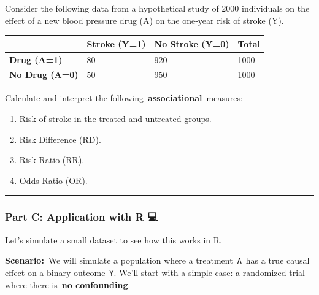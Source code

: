 \documentclass[
  10pt,
  letterpaper,
  DIV=11,
  numbers=noendperiod]{scrartcl}
\providecommand{\tightlist}{%
  \setlength{\itemsep}{0pt}\setlength{\parskip}{0pt}}
\begin{document}
Consider the following data from a hypothetical study of 2000
individuals on the effect of a new blood pressure drug (A) on the
one-year risk of stroke (Y).

\begin{longtable}[]{@{}llll@{}}
\toprule\noalign{}
& Stroke (Y=1) & No Stroke (Y=0) & Total \\
\midrule\noalign{}
\endhead
\bottomrule\noalign{}
\endlastfoot
\textbf{Drug (A=1)} & 80 & 920 & 1000 \\
\textbf{No Drug (A=0)} & 50 & 950 & 1000 \\
\end{longtable}

Calculate and interpret the following~\textbf{associational}~measures:

\begin{enumerate}
\def\labelenumi{\arabic{enumi}.}
\tightlist
\item
  Risk of stroke in the treated and untreated groups.
\item
  Risk Difference (RD).
\item
  Risk Ratio (RR).
\item
  Odds Ratio (OR).
\end{enumerate}

\begin{center}\rule{0.5\linewidth}{0.5pt}\end{center}

\subsubsection{Part C: Application with R
💻}\label{part-c-application-with-r-1}

Let's simulate a small dataset to see how this works in R.

\textbf{Scenario:}~We will simulate a population where a
treatment~\texttt{A}~has a true causal effect on a binary
outcome~\texttt{Y}. We'll start with a simple case: a randomized trial
where there is~\textbf{no confounding}.
\end{document}
